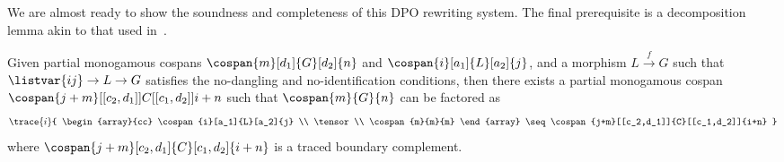 
We are almost ready to show the soundness and completeness of this DPO rewriting
system.
The final prerequisite is a decomposition lemma akin to that used
in~\cite{bonchi2022string}.

\begin{lemma}\label{lem:traced-decomposition}
    Given partial monogamous cospans \(
    \cospan{m}[d_1]{G}[d_2]{n}
    \) and \(
    \cospan{i}[a_1]{L}[a_2]{j}
    \), and a morphism \(
    L \xrightarrow{f} G
    \) such that \(\listvar{ij} \rightarrow L \rightarrow G\) satisfies the no-dangling
    and no-identification conditions, then there exists a partial monogamous
    cospan \(
    \cospan{j+m}[[c_2,d_1]]{C}[[c_1,d_2]]{i+n}
    \) such that \(
    \cospan{m}{G}{n}
    \) can be factored as
    \begin{gather*}
        \trace{i}{
            \begin{array}{cc}
                \cospan{i}[a_1]{L}[a_2]{j} \\
                \tensor                    \\
                \cospan{m}{m}{m}
            \end{array}
            \seq
            \cospan{j+m}[[c_2,d_1]]{C}[[c_1,d_2]]{i+n}
        }
    \end{gather*}
    where \(
    \cospan{j+m}[c_2,d_1]{C}[c_1,d_2]{i+n}
    \) is a traced boundary complement.
\end{lemma}
